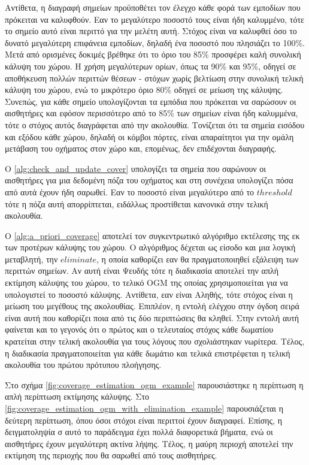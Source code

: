 Αντίθετα, η διαγραφή σημείων προϋποθέτει τον έλεγχο κάθε φορά των εμποδίων που πρόκειται να καλυφθούν. Εαν το μεγαλύτερο ποσοστό τους είναι ήδη καλυμμένο, τότε το σημείο αυτό είναι περιττό για την μελέτη αυτή. Στόχος είναι να καλυφθεί όσο το δυνατό μεγαλύτερη επιφάνεια εμποδίων, δηλαδή ένα ποσοστό που πλησιάζει το 100\%. Μετά από ορισμένες δοκιμές βρέθηκε ότι το όριο του 85\% προσφέρει καλή συνολική κάλυψη του χώρου. Η χρήση μεγαλύτερων ορίων, όπως τα 90\% και 95\%, οδηγεί σε αποθήκευση πολλών περιττών θέσεων - στόχων χωρίς βελτίωση στην συνολική τελική κάλυψη του χώρου, ενώ το μικρότερο όριο 80\% οδηγεί σε μείωση της κάλυψης. Συνεπώς, για κάθε σημείο υπολογίζονται τα εμπόδια που πρόκειται να σαρώσουν οι αισθητήρες και εφόσον περισσότερο από το 85\% των σημείων είναι ήδη καλυμμένα, τότε ο στόχος αυτός διαγράφεται από την ακολουθία. Τονίζεται ότι τα σημεία εισόδου και εξόδου κάθε χώρου, δηλαδή οι κόμβοι πόρτες, είναι απαραίτητοι για την ομάλη μετάβαση του οχήματος στον χώρο και, επομένως, δεν επιδέχονται διαγραφής.

Ο \ref{alg:check_and_update_cover} υπολογίζει τα σημεία που σαρώνουν οι αισθητήρες για μια δεδομένη πόζα του οχήματος και στη συνέχεια υπολογίζει πόσα από αυτά έχουν ήδη σαρωθεί. Εαν το ποσοστό είναι μεγαλύτερο από το $threshold$ τότε η πόζα αυτή απορρίπτεται, ειδάλλως προστίθεται κανονικά στην τελική ακολουθία.

Ο \ref{alg:a_priori_coverage} αποτελεί τον συγκεντρωτικό αλγόριθμο εκτέλεσης της εκ των προτέρων κάλυψης του χώρου. Ο αλγόριθμος δέχεται ως είσοδο και μια λογική μεταβλητή, την $eliminate$, η οποία καθορίζει εαν θα πραγματοποιηθεί εξάλειψη των περιττών σημείων. Αν αυτή είναι Ψευδής τότε η διαδικασία αποτελεί την απλή εκτίμηση κάλυψης του χώρου, το τελικό OGM της οποίας χρησιμοποιείται για να υπολογιστεί το ποσοστό κάλυψης. Αντίθετα, εαν είναι Αληθής, τότε στόχος είναι η μείωση του μεγέθους της ακολουθίας. Επιπλέον, η εντολή ελέγχου στην όγδοη σειρά είναι αυτή που καθορίζει ποια από τις δύο περιπτώσεις θα κληθεί. Στην εντολή αυτή φαίνεται και το γεγονός ότι ο πρώτος και ο τελευταίος στόχος κάθε δωματίου κρατείται στην τελική ακολουθία για τους λόγους που σχολιάστηκαν νωρίτερα. Τέλος, η διαδικασία πραγματοποιείται για κάθε δωμάτιο και τελικά επιστρέφεται η τελική ακολουθία του πρώτου πρότυπου πλοήγησης.

Στο σχήμα \ref{fig:coverage_estimation_ogm_example} παρουσιάστηκε η περίπτωση η απλή περίπτωση εκτίμησης κάλυψης. Στο \ref{fig:coverage_estimation_ogm_with_elimination_example} παρουσιάζεται η δεύτερη περίπτωση, όπου όσοι στόχοι είναι περιττοί έχουν διαγραφεί. Επίσης, η δειγματοληψία σ αυτό το παράδειγμα έχει πολλά διαφορετικά βήματα, ενώ οι αισθητήρες έχουν μεγαλύτερη ακτίνα λήψης. Τέλος, η μαύρη περιοχή αποτελεί την εκτίμηση της περιοχής που θα σαρωθεί από τους αισθητήρες.


